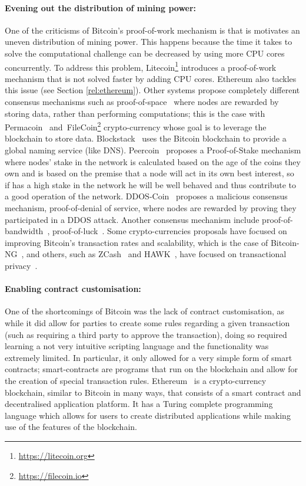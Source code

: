 \documentclass[letterpaper,twocolumn,10pt]{article}
\begin{document}
\paragraph{Evening out the distribution of mining power:} One of the criticisms of Bitcoin's proof-of-work mechanism is that is motivates an uneven distribution of mining power. This happens because the time it takes to solve the computational challenge can be decreased by using more CPU cores concurrently. To address this problem, Litecoin\footnote{\url{https://litecoin.org}} introduces a proof-of-work mechanism that is not solved faster by adding CPU cores. Ethereum also tackles this issue (see Section \ref{rel:ethereum}). Other systems propose completely different consensus mechanisms such as proof-of-space~\cite{Dziembowski:2015gs} where nodes are rewarded by storing data, rather than performing computations; this is the case with Permacoin~\cite{Miller:2014kb} and~FileCoin\footnote{\url{https://filecoin.io}} crypto-currency whose goal is to leverage the blockchain to store data. Blockstack~\cite{Ali:2016vq} uses the Bitcoin blockchain to provide a global naming service (like DNS). Peercoin~\cite{King:2012ur} proposes a Proof-of-Stake mechanism where nodes' stake in the network is calculated based on the age of the coins they own and is based on the premise that a node will act in its own best interest, so if has a high stake in the network he will be well behaved and thus contribute to a good operation of the network. DDOS-Coin~\cite{Wustrow:2016tda} proposes a malicious consensus mechanism, proof-of-denial of service, where nodes are rewarded by proving they participated in a DDOS attack. Another consensus mechanism include proof-of-bandwidth~\cite{Ghosh:2014wo}, proof-of-luck~\cite{Milutinovic:2016gs}. Some crypto-currencies proposals have focused on improving Bitcoin's transaction rates and scalability, which is the case of Bitcoin-NG~\cite{Luu:2016cl,Eyal:2016vn}, and others, such as ZCash~\cite{Anonymous:zwRGR7mQ} and HAWK~\cite{Kosba:2016iq}, have focused on transactional privacy~\cite{BenSasson:2015in}.

\paragraph{Enabling contract customisation:} One of the shortcomings of Bitcoin was the lack of contract customisation, as while it did allow for parties to create some rules regarding a given transaction (such as requiring a third party to approve the transaction), doing so required learning a not very intuitive scripting language and the functionality was extremely limited. In particular, it only allowed for a very simple form of smart contracts; smart-contracts are programs that run on the blockchain and allow for the creation of special transaction rules. Ethereum~\cite{Wood:2014ur,Buterin:2013ux} is a crypto-currency blockchain, similar to Bitcoin in many ways, that consists of a smart contract and decentralised application platform. It has a Turing complete programming language which allows for users to create distributed applications while making use of the features of the blockchain.
\end{document}
